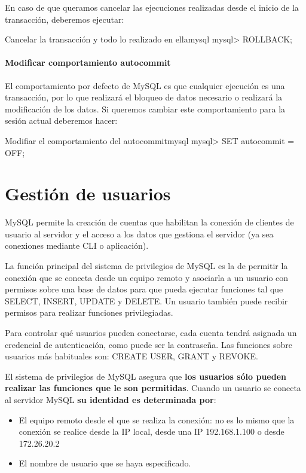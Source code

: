 En caso de que queramos cancelar las ejecuciones realizadas desde el inicio de la transacción, deberemos ejecutar:

\begin{mycode}{Cancelar la transacción y todo lo realizado en ella}{mysql}{}
mysql> ROLLBACK;
\end{mycode}


\subsubsection*{Modificar comportamiento autocommit}
El comportamiento por defecto de MySQL es que cualquier ejecución es una transacción, por lo que realizará el bloqueo de datos necesario o realizará la modificación de los datos. Si queremos cambiar este comportamiento para la sesión actual deberemos hacer:

\begin{mycode}{Modifiar el comportamiento del autocommit}{mysql}{}
mysql> SET autocommit = OFF;
\end{mycode}



\chapter{Gestión de usuarios}

MySQL permite la creación de cuentas que habilitan la conexión de clientes de usuario al servidor y el acceso a los datos que gestiona el servidor (ya sea conexiones mediante CLI o aplicación).

La función principal del sistema de privilegios de MySQL es la de permitir la conexión que se conecta desde un equipo remoto y asociarla a un usuario con permisos sobre una base de datos para que pueda ejecutar funciones tal que  SELECT, INSERT, UPDATE y DELETE. Un usuario también puede recibir permisos para realizar funciones privilegiadas.

Para controlar qué usuarios pueden conectarse, cada cuenta tendrá asignada un credencial de autenticación, como puede ser la contraseña. Las funciones sobre usuarios más habituales son: CREATE USER, GRANT y REVOKE.

El sistema de privilegios de MySQL asegura que \textbf{los usuarios sólo pueden realizar las funciones que le son permitidas}. Cuando un usuario se conecta al servidor MySQL \textbf{su identidad es determinada por}:

\begin{itemize}
    \item El equipo remoto desde el que se realiza la conexión: no es lo mismo que la conexión se realice desde la IP local, desde una IP 192.168.1.100 o desde 172.26.20.2
    \item El nombre de usuario que se haya especificado.
\end{itemize}

